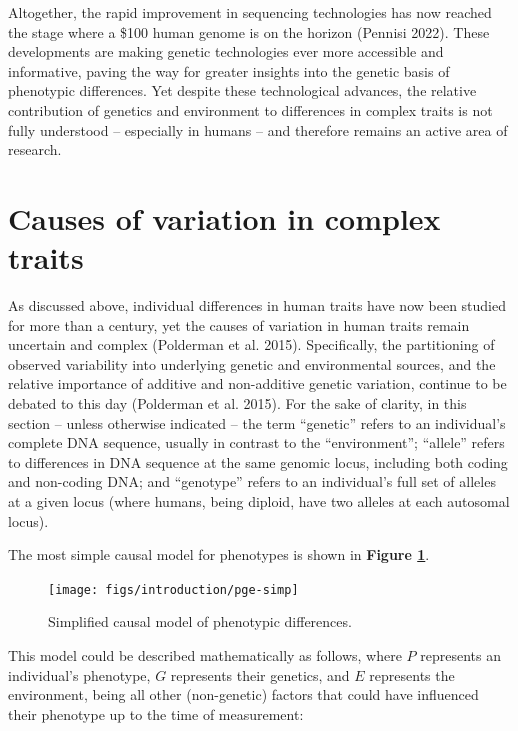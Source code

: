\documentclass[
]{book}
\begin{document}
Altogether, the rapid improvement in sequencing technologies has now reached the stage where a \$100 human genome is on the horizon (Pennisi 2022). These developments are making genetic technologies ever more accessible and informative, paving the way for greater insights into the genetic basis of phenotypic differences. Yet despite these technological advances, the relative contribution of genetics and environment to differences in complex traits is not fully understood -- especially in humans -- and therefore remains an active area of research.

\hypertarget{causes-of-variation-in-complex-traits}{%
\section{Causes of variation in complex traits}\label{causes-of-variation-in-complex-traits}}

As discussed above, individual differences in human traits have now been studied for more than a century, yet the causes of variation in human traits remain uncertain and complex (Polderman et al. 2015). Specifically, the partitioning of observed variability into underlying genetic and environmental sources, and the relative importance of additive and non-additive genetic variation, continue to be debated to this day (Polderman et al. 2015). For the sake of clarity, in this section -- unless otherwise indicated -- the term ``genetic'' refers to an individual's complete DNA sequence, usually in contrast to the ``environment''; ``allele'' refers to differences in DNA sequence at the same genomic locus, including both coding and non-coding DNA; and ``genotype'' refers to an individual's full set of alleles at a given locus (where humans, being diploid, have two alleles at each autosomal locus).

The most simple causal model for phenotypes is shown in \textbf{Figure \ref{fig:pge-simp}}.



\begin{figure}

{\centering \texttt{[image: figs/introduction/pge-simp]} 

}

\caption{Simplified causal model of phenotypic differences.}\label{fig:pge-simp}
\end{figure}

This model could be described mathematically as follows, where \(P\) represents an individual's phenotype, \(G\) represents their genetics, and \(E\) represents the environment, being all other (non-genetic) factors that could have influenced their phenotype up to the time of measurement:
\end{document}
